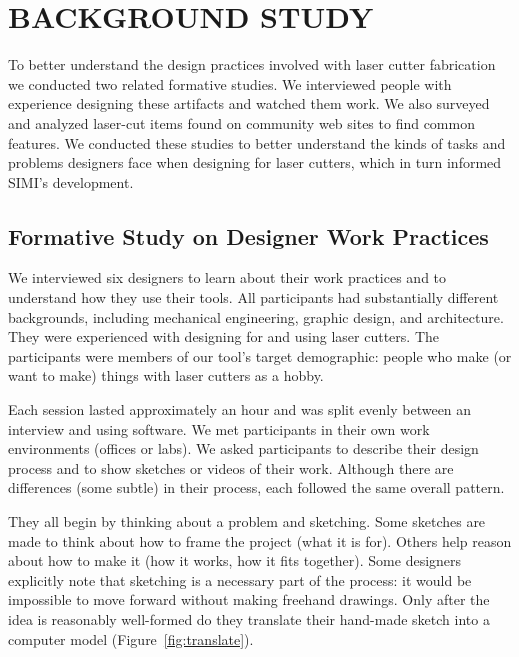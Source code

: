 \documentclass{article}
\begin{document}

\section{BACKGROUND STUDY}

To better understand the design practices involved with laser cutter
fabrication we conducted two related formative studies. We interviewed
people with experience designing these artifacts and watched them
work. We also surveyed and analyzed laser-cut items found on community
web sites to find common features. We conducted these studies to
better understand the kinds of tasks and problems designers face when
designing for laser cutters, which in turn informed SIMI's
development.

\subsection{Formative Study on Designer Work Practices}
\label{sec:formative}

We interviewed six designers to learn about their work practices and
to understand how they use their tools. All participants had
substantially different backgrounds, including mechanical engineering,
graphic design, and architecture. They were experienced with designing
for and using laser cutters. The participants were members of our
tool's target demographic: people who make (or want to make) things
with laser cutters as a hobby.

Each session lasted approximately an hour and was split evenly between
an interview and using software. We met participants in their own work
environments (offices or labs). We asked participants to describe
their design process and to show sketches or videos of their
work. Although there are differences (some subtle) in their process,
each followed the same overall pattern.

They all begin by thinking about a problem and sketching. Some
sketches are made to think about how to frame the project (what it is
for). Others help reason about how to make it (how it works, how it
fits together). Some designers explicitly note that sketching is a
necessary part of the process: it would be impossible to move forward
without making freehand drawings. Only after the idea is reasonably
well-formed do they translate their hand-made sketch into a computer
model (Figure~\ref{fig:translate}).
\end{document}
